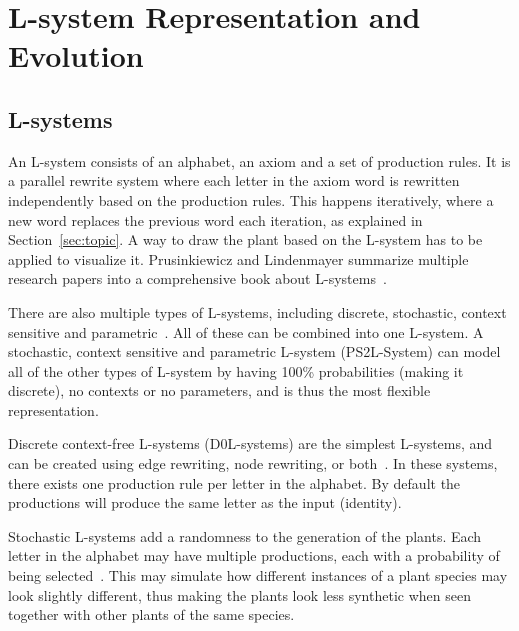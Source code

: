 \chapter{L-system Representation and Evolution}
\label{chap:background}

\section{L-systems}
An \gls{L-system} consists of an alphabet, an axiom and a set of production rules.
It is a parallel rewrite system where each letter in the axiom word is rewritten independently based on the production rules.
This happens iteratively, where a new word replaces the previous word each iteration, as explained in Section~\ref{sec:topic}.
A way to draw the plant based on the \gls{L-system} has to be applied to visualize it.
Prusinkiewicz and Lindenmayer summarize multiple research papers into a comprehensive book about \glspl{L-system}~\cite{2012Prusinkiewicz}.

There are also multiple types of \glspl{L-system}, including discrete, stochastic, context sensitive and parametric~\cite{2012Prusinkiewicz}.
All of these can be combined into one \gls{L-system}.
A stochastic, context sensitive and parametric \gls{L-system} (PS2L-System) can model all of the other types of \gls{L-system} by having 100\% probabilities (making it discrete), no contexts or no parameters, and is thus the most flexible representation.

Discrete context-free \glspl{L-system} (D0L-systems) are the simplest \glspl{L-system}, and can be created using edge rewriting, node rewriting, or both~\cite{2012Prusinkiewicz}.
In these systems, there exists one production rule per letter in the alphabet.
By default the productions will produce the same letter as the input (identity).

Stochastic \glspl{L-system} add a randomness to the generation of the plants.
Each letter in the alphabet may have multiple productions, each with a probability of being selected~\cite{2012Prusinkiewicz}.
This may simulate how different instances of a plant species may look slightly different, thus making the plants look less synthetic when seen together with other plants of the same species.


